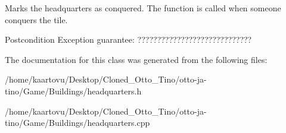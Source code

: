 Marks the headquarters as conquered. The function is called when someone conquers the tile. 

\begin{DoxyPostcond}{Postcondition}
Exception guarantee\-: ????????????????????????????? 
\end{DoxyPostcond}


The documentation for this class was generated from the following files\-:\begin{DoxyCompactItemize}
\item 
/home/kaartovu/\-Desktop/\-Cloned\-\_\-\-Otto\-\_\-\-Tino/otto-\/ja-\/tino/\-Game/\-Buildings/headquarters.\-h\item 
/home/kaartovu/\-Desktop/\-Cloned\-\_\-\-Otto\-\_\-\-Tino/otto-\/ja-\/tino/\-Game/\-Buildings/headquarters.\-cpp\end{DoxyCompactItemize}
